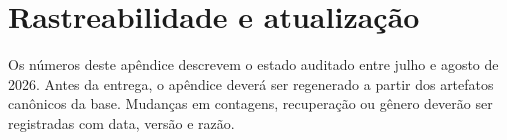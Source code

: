 \section{Rastreabilidade e atualização}

Os números deste apêndice descrevem o estado auditado entre julho e agosto de 2026. Antes da entrega, o apêndice deverá ser regenerado a partir dos artefatos canônicos da base. Mudanças em contagens, recuperação ou gênero deverão ser registradas com data, versão e razão.

